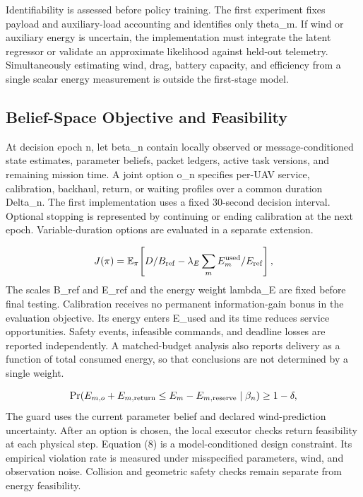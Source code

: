 \documentclass[10pt,twocolumn,letterpaper]{article}
\begin{document}
Identifiability is assessed before policy training. The first experiment fixes payload and auxiliary-load accounting and identifies only theta\_m. If wind or auxiliary energy is uncertain, the implementation must integrate the latent regressor or validate an approximate likelihood against held-out telemetry. Simultaneously estimating wind, drag, battery capacity, and efficiency from a single scalar energy measurement is outside the first-stage model.

\subsection{Belief-Space Objective and Feasibility}
At decision epoch n, let beta\_n contain locally observed or message-conditioned state estimates, parameter beliefs, packet ledgers, active task versions, and remaining mission time. A joint option o\_n specifies per-UAV service, calibration, backhaul, return, or waiting profiles over a common duration Delta\_n. The first implementation uses a fixed 30-second decision interval. Optional stopping is represented by continuing or ending calibration at the next epoch. Variable-duration options are evaluated in a separate extension.

\begin{equation}
J(\pi)=\mathbb E_\pi\!\left[D/B_{\rm ref}-\lambda_E\sum_m E_m^{\rm used}/E_{\rm ref}\right],
\end{equation}
The scales B\_ref and E\_ref and the energy weight lambda\_E are fixed before final testing. Calibration receives no permanent information-gain bonus in the evaluation objective. Its energy enters E\_used and its time reduces service opportunities. Safety events, infeasible commands, and deadline losses are reported independently. A matched-budget analysis also reports delivery as a function of total consumed energy, so that conclusions are not determined by a single weight.

\begin{equation}
\Pr\!\left(E_{m,o}+E_{m,\rm return}\le E_m-E_{m,\rm reserve}\mid\beta_n\right)\ge1-\delta,
\end{equation}
The guard uses the current parameter belief and declared wind-prediction uncertainty. After an option is chosen, the local executor checks return feasibility at each physical step. Equation (8) is a model-conditioned design constraint. Its empirical violation rate is measured under misspecified parameters, wind, and observation noise. Collision and geometric safety checks remain separate from energy feasibility.
\end{document}

